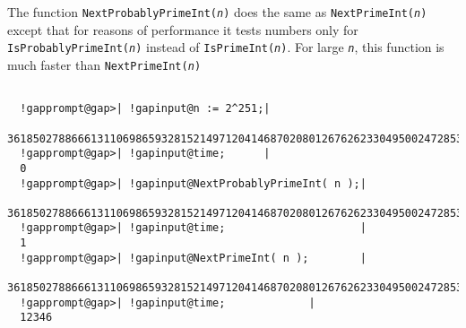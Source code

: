 \documentclass[a4paper,11pt]{report}
\begin{document}
{{{ The function \texttt{NextProbablyPrimeInt(\mbox{\texttt{\mdseries\slshape n}})} does the same as \texttt{NextPrimeInt(\mbox{\texttt{\mdseries\slshape n}})} except that for reasons of performance it tests numbers only for \texttt{IsProbablyPrimeInt(\mbox{\texttt{\mdseries\slshape n}})} instead of \texttt{IsPrimeInt(\mbox{\texttt{\mdseries\slshape n}})}. For large \mbox{\texttt{\mdseries\slshape n}}, this function is much faster than \texttt{NextPrimeInt(\mbox{\texttt{\mdseries\slshape n}})} 

 }

 
\begin{Verbatim}[commandchars=!@|,fontsize=\small,frame=single,label=Example]
  
  !gapprompt@gap>| !gapinput@n := 2^251;|
  3618502788666131106986593281521497120414687020801267626233049500247285301248
  !gapprompt@gap>| !gapinput@time;      |
  0
  !gapprompt@gap>| !gapinput@NextProbablyPrimeInt( n );|
  3618502788666131106986593281521497120414687020801267626233049500247285301313
  !gapprompt@gap>| !gapinput@time;                     |
  1
  !gapprompt@gap>| !gapinput@NextPrimeInt( n );        |
  3618502788666131106986593281521497120414687020801267626233049500247285301313
  !gapprompt@gap>| !gapinput@time;             |
  12346
  
\end{Verbatim}
 }

 }

           
\end{document}
